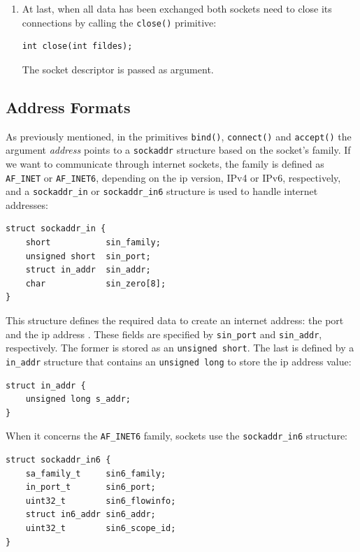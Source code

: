\begin{enumerate}
\item At last, when all data has been exchanged both sockets need to close its connections by calling the \texttt{close()} primitive:

\begin{lstlisting}[caption=Declaration of the \texttt{close()} function]
int close(int fildes);
\end{lstlisting}

The socket descriptor is passed as argument.
\end{enumerate}

\subsection{Address Formats}

As previously mentioned, in the primitives \texttt{bind()}, \texttt{connect()} and \texttt{accept()} the argument \textit{address} points to a \texttt{sockaddr} structure based on the socket's family. If we want to communicate through internet sockets, the family is defined as \texttt{AF\_INET} or \texttt{AF\_INET6}, depending on the \gls{ip} version, IPv4 or IPv6, respectively, and a \texttt{sockaddr\_in} or \texttt{sockaddr\_in6} structure is used to handle internet addresses:

\begin{lstlisting}[caption=Declaration of the \texttt{sockaddr\_in} structure]
struct sockaddr_in {
    short			sin_family; 
    unsigned short	sin_port;
    struct in_addr	sin_addr; 
    char			sin_zero[8]; 
}
\end{lstlisting}

This structure defines the required data to create an internet address: the port and the \gls{ip} address \cite{IPSockets:Beej}. These fields are specified by \texttt{sin\_port} and \texttt{sin\_addr}, respectively. The former is stored as an \texttt{unsigned short}. The last is defined by a \texttt{in\_addr} structure that contains an \texttt{unsigned long} to store the \gls{ip} address value:

\begin{lstlisting}[caption=Declaration of the \texttt{in\_addr} structure]
struct in_addr {
    unsigned long s_addr;
}
\end{lstlisting}

When it concerns the \texttt{AF\_INET6} family, sockets use the \texttt{sockaddr\_in6} structure:

\begin{lstlisting}[caption=Declaration of the \texttt{sockaddr\_in} structure]
struct sockaddr_in6 {
    sa_family_t     sin6_family;
    in_port_t       sin6_port;
    uint32_t        sin6_flowinfo;
    struct in6_addr sin6_addr;
    uint32_t        sin6_scope_id;
}
\end{lstlisting}

